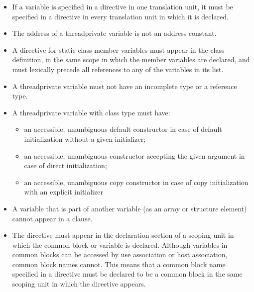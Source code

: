 {{{{\begin{itemize}
\item If a variable is specified in a  directive in one translation unit, it 
must be specified in a  directive in every translation unit in which 
it is declared.

\item The address of a threadprivate variable is not an address constant.
\ccppspecificend

\cppspecificstart
\item A  directive for static class member variables must appear in the 
class definition, in the same scope in which the member variables are declared, and 
must lexically precede all references to any of the variables in its list.

\item A threadprivate variable must not have an incomplete type or a reference type.

\item A threadprivate variable with class type must have:

\begin{itemize} %
\item an accessible, unambiguous default constructor in case of default initialization 
without a given initializer;

\item an accessible, unambiguous constructor accepting the given argument in case of 
direct initialization;

\item an accessible, unambiguous copy constructor in case of copy initialization with an 
explicit initializer
\end{itemize} %
\cppspecificend

\end{itemize} %

\fortranspecificstart
\begin{itemize} %
\item A variable that is part of another variable (as an array or structure element) cannot 
appear in a  clause.

\item The  directive must appear in the declaration section of a scoping 
unit in which the common block or variable is declared. Although variables in 
common blocks can be accessed by use association or host association, common 
block names cannot. This means that a common block name specified in a 
 directive must be declared to be a common block in the same 
scoping unit in which the  directive appears. 


\end{itemize}}}}}
